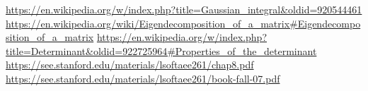 \documentclass{paper}
\begin{document}
\begin{thebibliography}{9}%
	 \url{https://en.wikipedia.org/w/index.php?title=Gaussian_integral&oldid=920544461}
	 \url{https://en.wikipedia.org/wiki/Eigendecomposition_of_a_matrix#Eigendecomposition_of_a_matrix}
	 \url{https://en.wikipedia.org/w/index.php?title=Determinant&oldid=922725964#Properties_of_the_determinant}
	 \url{https://see.stanford.edu/materials/lsoftaee261/chap8.pdf}
	 \url{https://see.stanford.edu/materials/lsoftaee261/book-fall-07.pdf}
\end{thebibliography}
\end{document}
